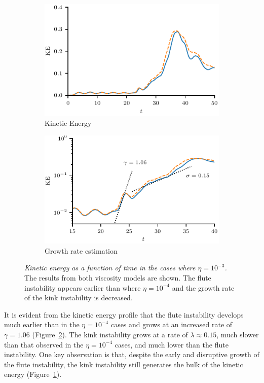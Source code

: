 \documentclass[fleqn,usenatbib]{mnras}
\newcommand{\mycaption}[2]{\caption[#1]{\emph{#1} #2}}
\begin{document}
\begin{figure}
  \centering
    \begin{subfigure}{0.49\textwidth}
      \includegraphics[width=\linewidth]{kinetic_energy-3.pdf}
      \caption{Kinetic Energy}
      \label{fig:kink_ke-3}
    \end{subfigure}
    \hfill
    \begin{subfigure}{0.49\textwidth}
      \includegraphics[width=\linewidth]{kinetic_energy_log-3.pdf}
      \caption{Growth rate estimation}
      \label{fig:kink_ke_log-3}
    \end{subfigure}
\mycaption{Kinetic energy as a function of time in the cases where
$\eta=10^{-3}$.}{The results from both viscosity models are shown. The flute
instability appears earlier than where $\eta=10^{-4}$ and the growth rate of
the kink instability is decreased.}
\label{fig:kink_str8_ke-3}%
\end{figure}

It is evident from the kinetic energy profile that the flute instability
develops much earlier than in the $\eta=10^{-4}$ cases and grows at an
increased rate of $\gamma = 1.06$ (Figure~\ref{fig:kink_ke_log-3}). The kink
instability grows at a rate of $\lambda \approx 0.15$, much slower than that
observed in the $\eta=10^{-4}$ cases, and much lower than the flute
instability. One key observation is that, despite the early and disruptive
growth of the flute instability, the kink instability still generates the bulk
of the kinetic energy (Figure~\ref{fig:kink_ke-3}).
\end{document}
